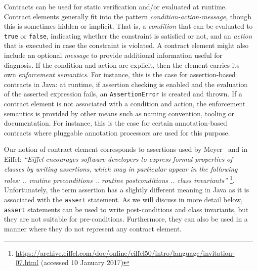 \documentclass[a4paper,UKenglish]{lipics-v2016}
\begin{document}

Contracts can be used for static verification and/or evaluated at runtime.  Contract elements generally fit into the pattern {\em condition-action-message}, though this is sometimes hidden or implicit.  That is, a \textit{condition} that can be evaluated to \texttt{true} or \texttt{false}, indicating whether the constraint is satisfied or not, and an \textit{action} that is executed in case the constraint is violated. A contract element might also include an optional \textit{message} to provide additional information useful for diagnosis. If the condition and action are explicit, then the element carries its own \textit{enforcement semantics}. For instance, this is the case for assertion-based contracts in Java: at runtime, if assertion checking is enabled and the evaluation of the asserted expression fails, an \texttt{AssertionError} is created and thrown. If a contract element is not associated with a condition and action, the enforcement semantics is provided by other means such as naming convention, tooling or documentation. For instance, this is the case for certain annotation-based contracts where pluggable annotation processors are used for this purpose. 



%
%

Our notion of contract element corresponds to assertions used by Meyer~\cite{meyer1992applying} and in Eiffel: \textit{``Eiffel encourages software developers to express formal properties of classes by writing assertions, which may in particular appear in the following roles: .. routine preconditions .. routine postconditions .. class invariants''} \footnote{\url{https://archive.eiffel.com/doc/online/eiffel50/intro/language/invitation-07.html} (accessed 10 January 2017)}. Unfortunately, the term assertion has a slightly different meaning in Java as it is associated with the \texttt{assert} statement. As we will discuss in more detail below, \texttt{assert} statements can be used to write post-conditions and class invariants, but they are not suitable for pre-conditions. Furthermore, they can also be used in a manner where they do not represent any contract element.   
\end{document}
